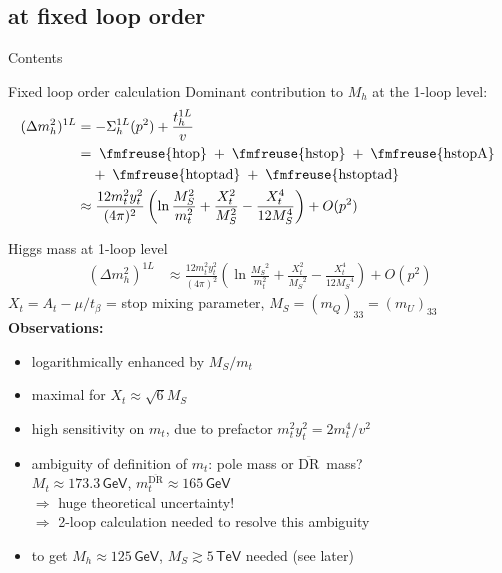 \documentclass[hyperref={pdfpagelabels=false},ngerman]{beamer}
\newcommand{\fmfvcenter}[1]{\;\vcenter{\hbox{\fmfreuse{#1}}}\;}
\newcommand{\eh}[1]{\,\mathsf{#1}}
\newcommand{\MS}{\ensuremath{M_S}}
\renewcommand{\emph}{\textbf}
\newcommand{\DRbar}{\ensuremath{\overline{\text{DR}}}}
\begin{document}
\subsection{at fixed loop order}

\begin{frame}{Contents}
  \tableofcontents[
  currentsection,
  currentsubsection,
  subsectionstyle=show/shaded/hide]  
\end{frame}

\begin{frame}{Fixed loop order calculation}
  Dominant contribution to $M_h$ at the 1-loop level:
  \begin{align*}
    (\Delta m_h^2)^{1L} &= -\Sigma_h^{1L}(p^2) + \frac{t_h^{1L}}{v} \\
    &= \fmfvcenter{htop} + \fmfvcenter{hstop} + \fmfvcenter{hstopA} \\
    &\phantom{={}} + \fmfvcenter{htoptad} + \fmfvcenter{hstoptad} \\
    &\approx \frac{12 m_t^2 y_t^2}{(4\pi)^2} \left(
      \ln\frac{\MS^2}{m_t^2}
      + \frac{X_t^2}{\MS^2}
      - \frac{X_t^4}{12 \MS^4}
    \right) + O(p^2)
  \end{align*}
\end{frame}

\begin{frame}{Higgs mass at 1-loop level}
  \begin{align*}
    (\Delta m_h^2)^{1L} &\approx
    \frac{12 m_t^2 y_t^2}{(4\pi)^2} \left(
      \ln\frac{\MS^2}{m_t^2}
      + \frac{X_t^2}{\MS^2}
      - \frac{X_t^4}{12 \MS^4}
    \right) + O(p^2)
  \end{align*}
  $X_t = A_t - \mu/t_\beta$ = stop mixing parameter,
  $\MS = (m_Q)_{33} = (m_U)_{33}$
  \\[1em]
  \emph{Observations:}
  \begin{itemize}
  \item logarithmically enhanced by $\MS / m_t$
  \item maximal for $X_t \approx \sqrt{6} \MS$
  \item high sensitivity on $m_t$, due to prefactor $m_t^2 y_t^2 = 2 m_t^4/v^2$
  \item ambiguity of definition of $m_t$: pole mass or \DRbar\ mass? \\
    $M_t \approx 173.3\eh{GeV}$, $m_t^{\DRbar} \approx 165\eh{GeV}$ \\
    $\Rightarrow$ huge theoretical uncertainty!\\
    $\Rightarrow$ 2-loop calculation needed to resolve this ambiguity
  \item to get $M_h \approx 125\eh{GeV}$, $\MS \gtrsim 5\eh{TeV}$ needed
    (see later)
  \end{itemize}
\end{frame}
\end{document}
